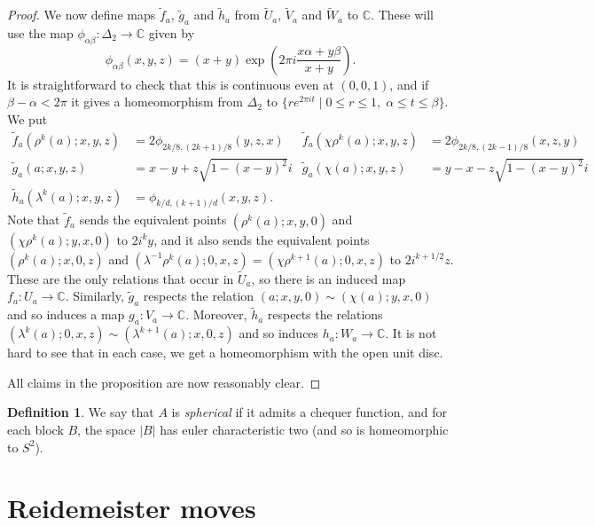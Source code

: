 \documentclass{amsart}
\newcommand{\C}         {{\mathbb{C}}}
\newcommand{\st}        {\;|\;}
\newcommand{\Dl}        {\Delta}
\newcommand{\al}        {\alpha}
\newcommand{\bt}        {\beta}
\newcommand{\lm}        {\lambda}
\newcommand{\tU}	{\widetilde{U}}
\newcommand{\tV}	{\widetilde{V}}
\newcommand{\tW}	{\widetilde{W}}
\newcommand{\tf}	{\widetilde{f}}
\newcommand{\tg}	{\widetilde{g}}
\renewcommand{\th}        {\widetilde{h}}
\renewcommand{\:}{\colon}
\theoremstyle{definition}
\newtheorem{definition}[theorem]{Definition}
\begin{document}
\begin{proof}
 We now define maps $\tf_a$, $\tg_a$ and $\th_a$ from $\tU_a$, $\tV_a$
 and $\tW_a$ to $\C$.  These will use the map
 $\phi_{\al\bt}\:\Dl_2\to\C$ given by 
 \[ \phi_{\al\bt}(x,y,z) =
     (x+y)\exp\left(2\pi i\frac{x\al+y\bt}{x+y}\right).
 \]
 It is straightforward to check that this is continuous even at
 $(0,0,1)$, and if $\bt-\al<2\pi$ it gives a homeomorphism from
 $\Dl_2$ to $\{re^{2\pi i t}\st 0\leq r\leq 1,\;\al\leq t\leq\bt\}$.  
 We put 
 \begin{align*}
  \tf_a(\rho^k(a);x,y,z) &= 2\phi_{2k/8,(2k+1)/8}(y,z,x) &
  \tf_a(\chi\rho^k(a);x,y,z) &= 2\phi_{2k/8,(2k-1)/8}(x,z,y) \\
  \tg_a(a;x,y,z) &= x-y+z\sqrt{1-(x-y)^2}i &
  \tg_a(\chi(a);x,y,z) &= y-x-z\sqrt{1-(x-y)^2}i \\
  \th_a(\lm^k(a);x,y,z) &= \phi_{k/d,(k+1)/d}(x,y,z).
 \end{align*}
 Note that $\tf_a$ sends the equivalent points $(\rho^k(a);x,y,0)$ and
 $(\chi\rho^k(a);y,x,0)$ to $2i^ky$, and it also sends the
 equivalent points $(\rho^k(a);x,0,z)$ and
 $(\lm^{-1}\rho^k(a);0,x,z)=(\chi\rho^{k+1}(a);0,x,z)$ to
 $2i^{k+1/2}z$.  These are the only relations that occur in
 $\tU_a$, so there is an induced map $f_a\:U_a\to\C$.  Similarly,
 $\tg_a$ respects the relation $(a;x,y,0)\sim(\chi(a);y,x,0)$ and so
 induces a map $g_a\:V_a\to\C$.  Moreover, $\th_a$ respects the
 relations $(\lm^k(a);0,x,z)\sim(\lm^{k+1}(a);x,0,z)$ and so induces
 $h_a\:W_a\to\C$.  It is not hard to see that in each case, we get a
 homeomorphism with the open unit disc.  

 All claims in the proposition are now reasonably clear.
\end{proof}

\begin{definition}
 We say that $A$ is \emph{spherical} if it admits a chequer function,
 and for each block $B$, the space $|B|$ has euler characteristic two
 (and so is homeomorphic to $S^2$).
\end{definition}

\section{Reidemeister moves}
\end{document}
